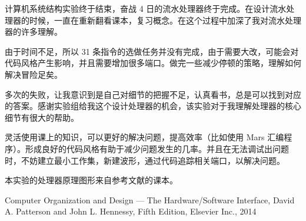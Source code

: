 \documentclass[a4paper,UTF8]{ctexart}
\begin{document}
计算机系统结构实验终于结束，奋战 4 日的流水处理器终于完成。在设计流水处理器的时候，一直在重新翻看课本，复习概念。在这个过程中加深了我对流水处理器的许多理解。

由于时间不足，所以 31 条指令的选做任务并没有完成，由于需要大改，可能会对代码风格产生影响，并且需要增加很多端口。做完一些减少停顿的策略，理解如何解决冒险足矣。

多次的失败，让我意识到是自己对细节的把握不足，认真看书，总是可以找到对应的答案。感谢实验组给我这个设计处理器的机会，该实验对于我理解处理器的核心细节有很大的帮助。

灵活使用课上的知识，可以更好的解决问题，提高效率（比如使用 Mars 汇编程序）。形成良好的代码风格有助于减少问题发生的几率。并且在无法调试出问题时，不妨建立最小工作集，新建波形，通过代码追踪相关端口，以解决问题。

本实验的处理器原理图形来自参考文献的课本。
\begin{thebibliography}{}
    \bibitem[1]{}
    Computer Organization and Design --- The Hardware/Software Interface, David A. Patterson and John L. Hennessy, Fifth Edition, Elsevier Inc., 2014
\end{thebibliography}
\end{document}
